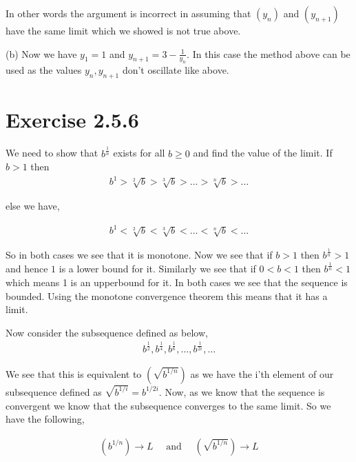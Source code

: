 \documentclass[a4paper]{report}
\begin{document}
\vspace{1em}

In other words the argument is incorrect in assuming that $(y_n)$ and $(y_{n + 1})$ have the same limit which we showed is not true above.

\vspace{1em}

(b)
Now we have $y_1 = 1$ and $y_{n + 1} = 3 - \frac{1}{y_n}$. In this case the method above can be used as the values $y_n, y_{n + 1}$ don't oscillate like above.


\section*{Exercise 2.5.6}

We need to show that $b^{\frac{1}{n}}$ exists for all $b \ge 0$ and find the value of the limit. If $b > 1$ then
\begin{align*}
	b^{1} > \sqrt[2]{b}> \sqrt[3]{b} > \dots > \sqrt[n]{b} >  \dots
\end{align*}

else we have,

\begin{align*}
	b^{1} < \sqrt[2]{b}< \sqrt[3]{b} < \dots < \sqrt[n]{b} <  \dots
\end{align*}

So in both cases we see that it is monotone. Now we see that  if $b > 1$ then $b^{\frac{1}{n}} > 1$ and hence $1$ is a lower bound for it. Similarly we see that if $ 0 < b < 1$ then $b^{\frac{1}{n}} < 1$ which means 1 is an upperbound for it. In both cases we see that the sequence is bounded. Using the monotone convergence theorem this means that it has a limit.


\vspace{1em}
Now consider the subsequence defined as below,
\begin{align*}
	 b^{\frac{1}{2}}, b^{\frac{1}{4}}, b^{\frac{1}{6}}, \dots, b^{\frac{1}{2i}}, \dots
\end{align*}


We see that this is equivalent to $( \sqrt{b^{1 / n}})$ as we have the i'th element of our subsequence defined as $\sqrt{b^{1 / i}} = b^{1 / 2i}$. Now, as we know that the sequence is convergent we know that the subsequence converges to the same limit. So we have the following,

\begin{align*}
	(b^{1 / n}) \to L \quad \text{ and } \quad (\sqrt{b^{ 1 /n}}) \to L
\end{align*}
\end{document}
